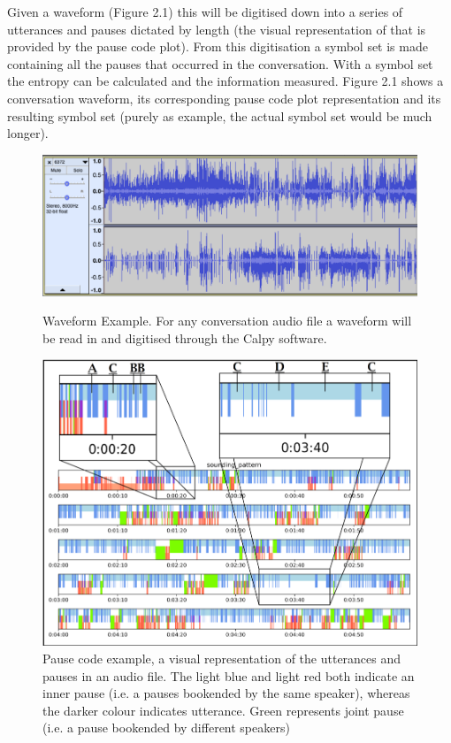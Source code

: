 Given a waveform (Figure 2.1) this will be digitised down into a series of utterances and pauses dictated by length (the visual representation of that is provided by the pause code plot). From this digitisation a symbol set is made containing all the pauses that occurred in the conversation. With a symbol set the entropy can be calculated and the information measured. Figure 2.1 shows a conversation waveform, its corresponding pause code plot representation and its resulting symbol set (purely as example, the actual symbol set would be much longer). 



\begin{figure}[h]
	\center
	\includegraphics[scale=0.5]{src/main-matter/theory/fig/soundwave_6732_short}
	\caption{Waveform Example. For any conversation audio file a waveform will be read in and digitised through the Calpy software.}
	\label{fig:example_waveform}
%
%
	\center
	\includegraphics[scale=0.7]{src/main-matter/theory/fig/picture2}
	\caption{Pause code example, a visual representation of the utterances and pauses in an audio file. The light blue and light red both indicate an inner pause (i.e. a pauses bookended by the same speaker), whereas the darker colour indicates utterance. Green represents joint pause (i.e. a pause bookended by different speakers)}

\end{figure}
